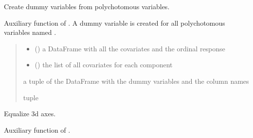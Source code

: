 \documentclass[letterpaper,10pt,english]{sphinxmanual}
\begin{document}
\begin{fulllineitems}
\label{\detokenize{cubmods:cubmods.general.dummies2}}
\pysigstartsignatures
{}
\pysigstopsignatures
\sphinxAtStartPar
Create dummy variables from polychotomous variables.

\sphinxAtStartPar
Auxiliary function of .
A dummy variable is created for all polychotomous variables named
.
\begin{quote}\begin{description}
\begin{itemize}
\item {} 
\sphinxAtStartPar
{} () \textendash{} a DataFrame with all the covariates and the ordinal response

\item {} 
\sphinxAtStartPar
{} () \textendash{} the list of all covariates for each component

\end{itemize}

\sphinxAtStartPar
a tuple of the DataFrame with the dummy variables and the column names

\sphinxAtStartPar
tuple

\end{description}\end{quote}

\end{fulllineitems}


\begin{fulllineitems}
\label{\detokenize{cubmods:cubmods.general.equal3d}}
\pysigstartsignatures
{}
\pysigstopsignatures
\sphinxAtStartPar
Equalize 3d axes.

\sphinxAtStartPar
Auxiliary function of .

\end{fulllineitems}
\end{document}
